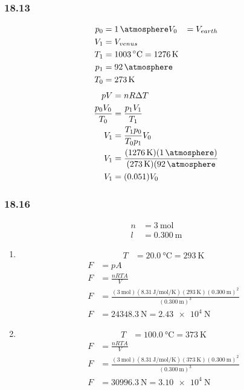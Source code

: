 \documentclass{article}
\begin{document}
\subsubsection{18.13}

\begin{align*}
	p_0 & = \SI{1}{\atmosphere}
	V_0 & = V_{earth} \\
	V_1 & = V_{venus} \\
	T_1 & = \SI{1003}{\celsius} = \SI{1276}{\kelvin} \\
	p_1 & = \SI{92}{\atmosphere} \\
	T_0 & = \SI{273}{\kelvin}
\end{align*}
\begin{align*}
	pV & = nR\Delta T \\
	\frac{ p_0V_0 }{ T_0 } & = \frac{ p_1V_1 }{ T_1 } \\
	V_1 & = \frac{ T_1p_0 }{ T_0p_1 } V_0 \\
	V_1 & = \frac{ (\SI{1276}{\kelvin})(\SI{1}{\atmosphere}) }{ (\SI{273}{\kelvin})(\SI{92}{\atmosphere} } \\
	V_1 & = (0.051)V_0
\end{align*}

\subsubsection{18.16}

\begin{align*}
	n & = \SI{3}{\mole} \\
	l & = \SI{0.300}{\meter}
\end{align*}
\begin{enumerate}[label = \boldalph]
	\item
		\begin{align*}
			T & = \SI{20.0}{\celsius} = \SI{293}{\kelvin}
		\end{align*}
		\begin{align*}
			F & = pA \\
			F & = \frac{ nRTA }{ V } \\
			F & = \frac{ (\SI{3}{\mole})(\SI{8.31}{\joule \per \mole \per \kelvin})(\SI{293}{\kelvin})(\SI{0.300}{\meter})^2 }{ (\SI{0.300}{\meter})^3 } \\
			F & = \SI{24348.3}{\newton} = \SI{2.43e4}{\newton}
		\end{align*}
	\item
		\begin{align*}
			T & = \SI{100.0}{\celsius} = \SI{373}{\kelvin}
		\end{align*}
		\begin{align*}
			F & = \frac{ nRTA }{ V } \\
			F & = \frac{ (\SI{3}{\mole})(\SI{8.31}{\joule \per \mole \per \kelvin})(\SI{373}{\kelvin})(\SI{0.300}{\meter})^2 }{ (\SI{0.300}{\meter})^3 } \\
			F & = \SI{30996.3}{\newton} = \SI{3.10e4}{\newton}
		\end{align*}
\end{enumerate}
\end{document}
